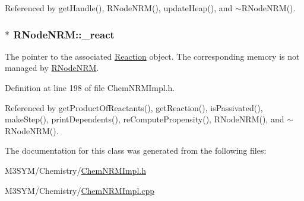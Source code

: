 Referenced by get\+Handle(), R\+Node\+N\+R\+M(), update\+Heap(), and $\sim$\+R\+Node\+N\+R\+M().

\hypertarget{classRNodeNRM_a36a50436adc1814fab1719a0ed7caf3c}{
\subsubsection[{\+\_\+react}]{$\ast$ R\+Node\+N\+R\+M\+::\+\_\+react\hspace{0.3cm}{\ttfamily [private]}}}\label{classRNodeNRM_a36a50436adc1814fab1719a0ed7caf3c}


The pointer to the associated \hyperlink{classReaction}{Reaction} object. The corresponding memory is not managed by \hyperlink{classRNodeNRM}{R\+Node\+N\+R\+M}. 



Definition at line 198 of file Chem\+N\+R\+M\+Impl.\+h.



Referenced by get\+Product\+Of\+Reactants(), get\+Reaction(), is\+Passivated(), make\+Step(), print\+Dependents(), re\+Compute\+Propensity(), R\+Node\+N\+R\+M(), and $\sim$\+R\+Node\+N\+R\+M().



The documentation for this class was generated from the following files\+:\begin{DoxyCompactItemize}
\item 
M3\+S\+Y\+M/\+Chemistry/\hyperlink{ChemNRMImpl_8h}{Chem\+N\+R\+M\+Impl.\+h}\item 
M3\+S\+Y\+M/\+Chemistry/\hyperlink{ChemNRMImpl_8cpp}{Chem\+N\+R\+M\+Impl.\+cpp}\end{DoxyCompactItemize}

